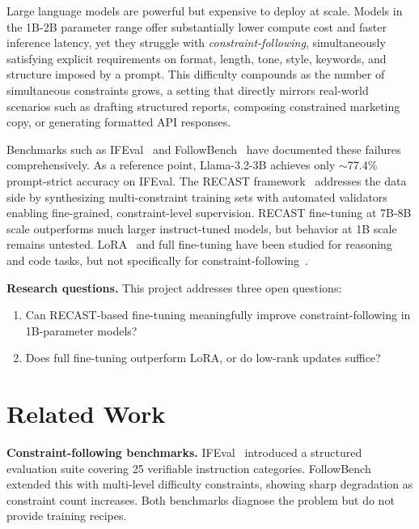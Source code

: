 \documentclass[10pt]{article}
\begin{document}
Large language models are powerful but expensive to deploy at scale.
Models in the 1B-2B parameter range offer substantially lower compute cost
and faster inference latency, yet they struggle with
\textit{constraint-following}, simultaneously satisfying explicit
requirements on format, length, tone, style, keywords, and structure
imposed by a prompt. This difficulty compounds as the number of
simultaneous constraints grows, a setting that directly mirrors
real-world scenarios such as drafting structured reports, composing
constrained marketing copy, or generating formatted API responses.

Benchmarks such as IFEval~\cite{zhou2023ifeval} and
FollowBench~\cite{jiang2024followbench} have documented these failures
comprehensively. As a reference point, Llama-3.2-3B achieves only
$\sim$77.4\% prompt-strict accuracy on IFEval. The RECAST framework~\cite{guo2025recast} addresses the data side
by synthesizing multi-constraint training sets with automated validators
enabling fine-grained, constraint-level supervision. RECAST fine-tuning at
7B-8B scale outperforms much larger instruct-tuned models, but behavior at
1B scale remains untested. LoRA~\cite{hu2022lora} and full
fine-tuning have been studied for reasoning and code tasks, but not
specifically for constraint-following~\cite{shuttleworth2024lora}.

\textbf{Research questions.} This project addresses three open questions:
\begin{enumerate}
  \item Can RECAST-based fine-tuning meaningfully improve constraint-following in 1B-parameter models?
  \item Does full fine-tuning outperform LoRA, or do low-rank updates suffice?
\end{enumerate}

\section{Related Work}

\textbf{Constraint-following benchmarks.}
IFEval~\cite{zhou2023ifeval} introduced a structured evaluation suite
covering 25 verifiable instruction categories. FollowBench~\cite{jiang2024followbench}
extended this with multi-level difficulty constraints, showing sharp
degradation as constraint count increases. Both benchmarks diagnose the
problem but do not provide training recipes.
\end{document}
